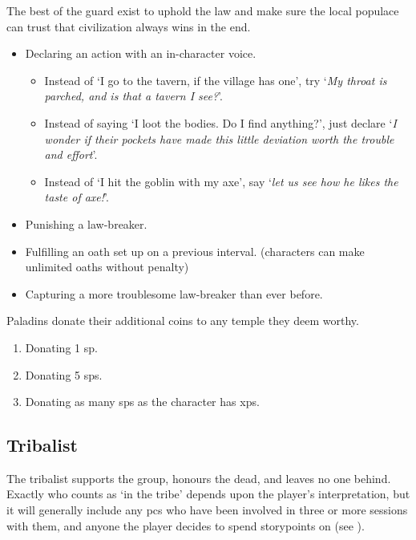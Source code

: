 \begin{multicols}{2}
The best of the \gls{guard} exist to uphold the law and make sure the local populace can trust that civilization always wins in the end.

\begin{itemize}
  \item
  Declaring an action with an in-character voice.
  \begin{itemize}
    \item
    Instead of `I go to the tavern, if the village has one', try `\textit{My throat is parched, and is that a tavern I see?}'.
    \item
    Instead of saying `I loot the bodies. Do I find anything?', just declare `\textit{I wonder if their pockets have made this little deviation worth the trouble and effort}'.
    \item
    Instead of `I hit the goblin with my axe', say `\textit{let us see how he likes the taste of axe!}'.
  \end{itemize}
  \item
  Punishing a law-breaker.
  \item
  Fulfilling an oath set up on a previous \gls{interval}.
  (characters can make unlimited oaths without penalty)
  \item
  Capturing a more troublesome law-breaker than ever before.
\end{itemize}

Paladins donate their additional coins to any temple they deem worthy.

\begin{enumerate}
  \item
  Donating 1 \gls{sp}.
  \item
  Donating 5 \glspl{sp}.
  \item
  Donating as many \glspl{sp} as the character has \glspl{xp}.
\end{enumerate}


\subsection{Tribalist}

The tribalist supports the group, honours the dead, and leaves no one behind.
Exactly who counts as `in the tribe' depends upon the player's interpretation, but it will generally include any \glspl{pc} who have been involved in three or more sessions with them, and anyone the player decides to spend \glspl{storypoint} on (see ).


\end{multicols}
